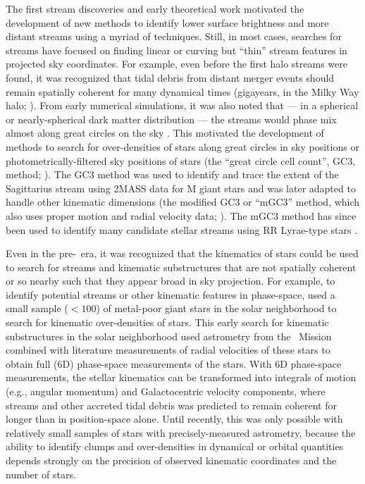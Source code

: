 \documentclass[final,5p,times,twocolumn,authoryear]{elsarticle}
\begin{document}
The first stream discoveries and early theoretical work motivated the development of
new methods to identify lower surface brightness and more distant streams using a myriad
of techniques.
Still, in most cases, searches for streams have focused on finding linear or curving but
``thin'' stream features in projected sky coordinates.
For example, even before the first halo streams were found, it was recognized that tidal
debris from distant merger events should remain spatially coherent for many dynamical
times (gigayears, in the Milky Way halo; \citealt{Johnston:199X, Helmi:1999}).
From early numerical simulations, it was also noted that --- in a spherical or
nearly-spherical dark matter distribution --- the streams would phase mix almost along
great circles on the sky \citep{Johnston:1996, others}.
This motivated the development of methods to search for over-densities of stars along
great circles in sky positions or photometrically-filtered sky positions of stars (the
``great circle cell count'', GC3, method; \citealt{Johnston:1996}).
The GC3 method was used to identify and trace the extent of the Sagittarius stream using
2MASS data for M giant stars \citep{Majewski:2003} and was later adapted to handle other
kinematic dimensions (the modified GC3 or ``mGC3'' method, which also uses proper motion
and radial velocity data; \citealt{Mateu:2011}).
The mGC3 method has since been used to identify many candidate stellar streams using RR
Lyrae-type stars \citep{Mateu:2018}.

Even in the pre-\gaia\ era, it was recognized that the kinematics of stars could be used
to search for streams and kinematic substructures that are not spatially coherent or so
nearby such that they appear broad in sky projection.
For example, to identify potential streams or other kinematic features in
phase-space, \citet{Helmi:1999} used a small sample ($<100$) of metal-poor giant stars
in the solar neighborhood to search for kinematic over-densities of stars.
This early search for kinematic substructures in the solar neighborhood used astrometry
from the \hipparcos\ Mission \citep{TODO} combined with literature measurements of
radial velocities of these stars to obtain full (6D) phase-space measurements of the
stars.
With 6D phase-space measurements, the stellar kinematics can be transformed into
integrals of motion (e.g., angular momentum) and Galactocentric velocity components,
where streams and other accreted tidal debris was predicted to remain coherent for
longer than in position-space alone.
Until recently, this was only possible with relatively small samples of stars with
precisely-measured astrometry, because the ability to identify clumps and over-densities
in dynamical or orbital quantities depends strongly on the precision of observed
kinematic coordinates and the number of stars.
\end{document}
